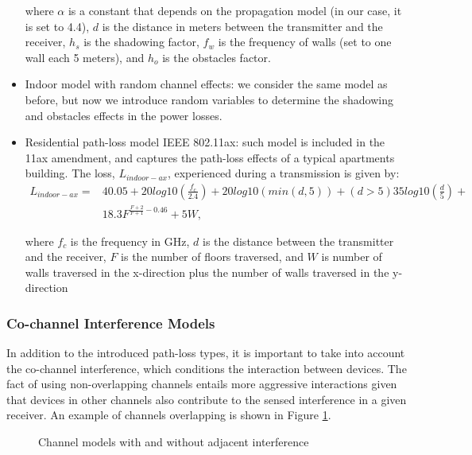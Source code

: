 \documentclass[a4paper]{article}
\begin{document}
\begin{itemize}
			where $\alpha$ is a constant that depends on the propagation model (in our case, it is set to 4.4), $d$ is the distance in meters between the transmitter and the receiver, $h_s$ is the shadowing factor, $f_w$ is the frequency of walls (set to one wall each 5 meters), and $h_o$ is the obstacles factor.
			\item Indoor model with random channel effects: we consider the same model as before, but now we introduce random variables to determine the shadowing and obstacles effects in the power losses.
			\item Residential path-loss model IEEE 802.11ax: such model is included in the 11ax amendment, and captures the path-loss effects of a typical apartments building. The loss, $L_{indoor-ax}$, experienced during a transmission is given by:
			\begin{equation}
				\begin{aligned}
				L_{indoor-ax} = &40.05 + 20 log10(\frac{f_c}{2.4}) + 20 log10(min(d,5)) + (d>5)  35 log10(\frac{d}{5}) + \\
				&18.3 F^{\frac{F+2}{F+1}-0.46} + 5 W,
				\end{aligned}
				\nonumber
			\end{equation}

			where $f_c$ is the frequency in GHz, $d$ is the distance between the transmitter and the receiver, $F$ is the number of floors traversed, and $W$ is number of walls traversed in the x-direction plus the number of walls traversed in the y-direction
		\end{itemize}	
	
		\subsubsection{Co-channel Interference Models}
		In addition to the introduced path-loss types, it is important to take into account the co-channel interference, which conditions the interaction between devices. The fact of using non-overlapping channels entails more aggressive interactions given that devices in other channels also contribute to the sensed interference in a given receiver. An example of channels overlapping is shown in Figure \ref{fig:cochannel_interference}.
		\begin{figure}[h!]
			\centering
			\caption{Channel models with and without adjacent interference}
			\label{fig:cochannel_interference}
		\end{figure}	
		
\end{document}
